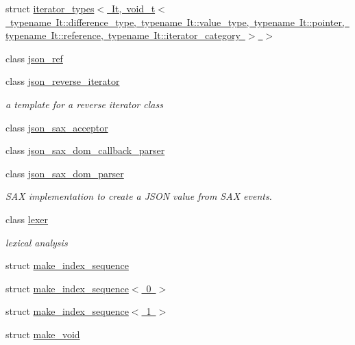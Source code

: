 \begin{DoxyCompactItemize}
\item 
struct \mbox{\hyperlink{structnlohmann_1_1detail_1_1iterator__types_3_01It_00_01void__t_3_01typename_01It_1_1difference_d2be8685966c97e00e99d4fd2366dc0b}{iterator\+\_\+types$<$ It, void\+\_\+t$<$ typename It\+::difference\+\_\+type, typename It\+::value\+\_\+type, typename It\+::pointer, typename It\+::reference, typename It\+::iterator\+\_\+category $>$ $>$}}
\item 
class \mbox{\hyperlink{classnlohmann_1_1detail_1_1json__ref}{json\+\_\+ref}}
\item 
class \mbox{\hyperlink{classnlohmann_1_1detail_1_1json__reverse__iterator}{json\+\_\+reverse\+\_\+iterator}}
\begin{DoxyCompactList}\small\item\em a template for a reverse iterator class \end{DoxyCompactList}\item 
class \mbox{\hyperlink{classnlohmann_1_1detail_1_1json__sax__acceptor}{json\+\_\+sax\+\_\+acceptor}}
\item 
class \mbox{\hyperlink{classnlohmann_1_1detail_1_1json__sax__dom__callback__parser}{json\+\_\+sax\+\_\+dom\+\_\+callback\+\_\+parser}}
\item 
class \mbox{\hyperlink{classnlohmann_1_1detail_1_1json__sax__dom__parser}{json\+\_\+sax\+\_\+dom\+\_\+parser}}
\begin{DoxyCompactList}\small\item\em S\+AX implementation to create a J\+S\+ON value from S\+AX events. \end{DoxyCompactList}\item 
class \mbox{\hyperlink{classnlohmann_1_1detail_1_1lexer}{lexer}}
\begin{DoxyCompactList}\small\item\em lexical analysis \end{DoxyCompactList}\item 
struct \mbox{\hyperlink{structnlohmann_1_1detail_1_1make__index__sequence}{make\+\_\+index\+\_\+sequence}}
\item 
struct \mbox{\hyperlink{structnlohmann_1_1detail_1_1make__index__sequence_3_010_01_4}{make\+\_\+index\+\_\+sequence$<$ 0 $>$}}
\item 
struct \mbox{\hyperlink{structnlohmann_1_1detail_1_1make__index__sequence_3_011_01_4}{make\+\_\+index\+\_\+sequence$<$ 1 $>$}}
\item 
struct \mbox{\hyperlink{structnlohmann_1_1detail_1_1make__void}{make\+\_\+void}}
\item 

\end{DoxyCompactItemize}
